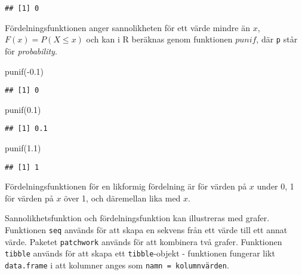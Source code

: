 \documentclass[
]{book}
\newenvironment{Shaded}{\begin{snugshade}}{\end{snugshade}}
\newcommand{\FloatTok}[1]{\textcolor[rgb]{0.00,0.00,0.81}{#1}}
\newcommand{\FunctionTok}[1]{\textcolor[rgb]{0.00,0.00,0.00}{#1}}
\newcommand{\NormalTok}[1]{#1}
\newcommand{\SpecialCharTok}[1]{\textcolor[rgb]{0.00,0.00,0.00}{#1}}
\theoremstyle{definition}
\theoremstyle{definition}
\theoremstyle{definition}
\theoremstyle{definition}
\theoremstyle{remark}
\begin{document}
\begin{verbatim}
## [1] 0
\end{verbatim}

Fördelningsfunktionen anger sannolikheten för ett värde mindre än \(x\), \(F(x) = P(X \leq x)\) och kan i R beräknas genom funktionen \(punif\), där \texttt{p} står för \emph{probability}.

\begin{Shaded}
\begin{Highlighting}[]
\FunctionTok{punif}\NormalTok{(}\SpecialCharTok{{-}}\FloatTok{0.1}\NormalTok{)}
\end{Highlighting}
\end{Shaded}

\begin{verbatim}
## [1] 0
\end{verbatim}

\begin{Shaded}
\begin{Highlighting}[]
\FunctionTok{punif}\NormalTok{(}\FloatTok{0.1}\NormalTok{)}
\end{Highlighting}
\end{Shaded}

\begin{verbatim}
## [1] 0.1
\end{verbatim}

\begin{Shaded}
\begin{Highlighting}[]
\FunctionTok{punif}\NormalTok{(}\FloatTok{1.1}\NormalTok{)}
\end{Highlighting}
\end{Shaded}

\begin{verbatim}
## [1] 1
\end{verbatim}

Fördelningsfunktionen för en likformig fördelning är för värden på \(x\) under 0, 1 för värden på \(x\) över 1, och däremellan lika med \(x\).

Sannolikhetsfunktion och fördelningsfunktion kan illustreras med grafer. Funktionen \texttt{seq} används för att skapa en sekvens från ett värde till ett annat värde. Paketet \texttt{patchwork} används för att kombinera två grafer. Funktionen \texttt{tibble} används för att skapa ett \texttt{tibble}-objekt - funktionen fungerar likt \texttt{data.frame} i att kolumner anges som \texttt{namn\ =\ kolumnvärden}.
\end{document}
